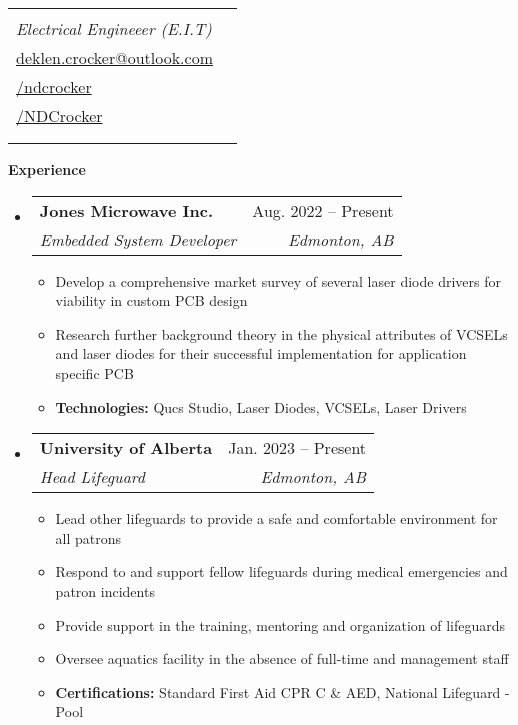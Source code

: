 \documentclass[letterpaper,12pt]{article}[leftmargin=*]
\makeatletter
\def \fullname {Nicolas Deklen Crocker}
\def \subtitle {Electrical Engineeer (E.I.T)}
\def \linkedinicon {\faLinkedin}
\def \linkedinlink {https://linkedin.com/in/ndcrocker/}
\def \linkedintext {/ndcrocker}
\def \phoneicon {\faPhone}
\def \phonetext {+1 (825) 333-4907}
\def \emailicon {\faEnvelope}
\def \emaillink {mailto:deklen.crocker@outlook.com}
\def \emailtext {deklen.crocker@outlook.com}
\def \githubicon {\faGithub}
\def \githublink {https://github.com/NDCrocker}
\def \githubtext {/NDCrocker}
\def \headertype {\singlecol} %
\def \entryspacing {-0pt}
\def \linkedin {\linkedinicon \hspace{3pt}\href{\linkedinlink}{\linkedintext}}
\def \phone {\phoneicon \hspace{3pt}{ \phonetext}}
\def \email {\emailicon \hspace{3pt}\href{\emaillink}{\emailtext}}
\def \github {\githubicon \hspace{3pt}\href{\githublink}{\githubtext}}
\renewcommand{\section}[2]{\vspace{5pt}
  \colorbox{secondary}{\color{white}\raggedbottom\normalsize\textbf{{#1}{\hspace{7pt}#2}}}
}
\newcommand{\resumeEntryStart}{\begin{itemize}[leftmargin=2.5mm]}
\newcommand{\resumeEntryEnd}{\end{itemize}\vspace{\entryspacing}}
\newcommand{\resumeItemListStart}{\begin{itemize}[leftmargin=4.5mm]}
\newcommand{\resumeItemListEnd}{\end{itemize}}
\newcommand{\resumeItem}[1]{
  \item\small{
    {#1 \vspace{-2pt}}
  }
}
\newcommand{\resumeEntryTSDL}[4]{
  \vspace{-1pt}\item[]
    \begin{tabularx}{0.97\textwidth}{X@{\hspace{60pt}}r}
      \textbf{\color{primary}#1} & {\firabook\color{accent}\small#2} \\
      \textit{\color{accent}\small#3} & \textit{\color{accent}\small#4} \\
    \end{tabularx}\vspace{-6pt}
}
\newcommand{\doublecol}[6]{
  \begin{tabularx}{\textwidth}{Xr}
    {
      \begin{tabular}[c]{l}
        \fontsize{35}{45}\selectfont{\color{primary}{{\textbf{\fullname}}}} \\
        {\textit{\subtitle}} %
      \end{tabular}
    } & {
      \begin{tabular}[c]{l@{\hspace{1.5em}}l}
        {\small#4} & {\small#1} \\
        {\small#5} & {\small#2} \\
        {\small#6} & {\small#3}
      \end{tabular}
    }
  \end{tabularx}
}
\newcommand{\singlecol}[6]{
  \begin{tabularx}{\textwidth}{Xr}
    {
      \begin{tabular}[b]{l}
        \fontsize{35}{45}\selectfont{\color{primary}{{\textbf{\fullname}}}} \\
        {\textit{\subtitle}} %
      \end{tabular}
    } & {
      \begin{tabular}[c]{l}
        {\small#1} \\
        {\small#2} \\
        {\small#3} \\
        {\small#4} \\
        {\small#5} \\
        {\small#6}
      \end{tabular}
    }
  \end{tabularx}
}
\makeatother
\begin{document}


\headertype{\phone}{\email}{\linkedin}{\github}{}{} %
\vspace{-25pt} %

\section{\faPieChart}{Experience}

  \resumeEntryStart
    \resumeEntryTSDL
      {Jones Microwave Inc.}{Aug. 2022 -- Present}
      {Embedded System Developer}{Edmonton, AB}
    \resumeItemListStart
      \resumeItem {Develop a comprehensive market survey of several laser diode drivers for viability in custom PCB design}
      \resumeItem {Research further background theory in the physical attributes of VCSELs and laser diodes for their successful
      implementation for application specific PCB}
      \resumeItem {\textbf{Technologies:} Qucs Studio, Laser Diodes, VCSELs, Laser Drivers}
    \resumeItemListEnd
  \resumeEntryEnd

  \resumeEntryStart
    \resumeEntryTSDL
      {University of Alberta}{Jan. 2023 -- Present}
      {Head Lifeguard}{Edmonton, AB}
    \resumeItemListStart
      \resumeItem {Lead other lifeguards to provide a safe and comfortable environment for all patrons}
      \resumeItem {Respond to and support fellow lifeguards during medical emergencies and patron incidents}
      \resumeItem {Provide support in the training, mentoring and organization of lifeguards}
      \resumeItem {Oversee aquatics facility in the absence of full-time and management staff}
      \resumeItem {\textbf{Certifications:} Standard First Aid CPR C \& AED, National Lifeguard - Pool}
    \resumeItemListEnd
  \resumeEntryEnd

\end{document}
